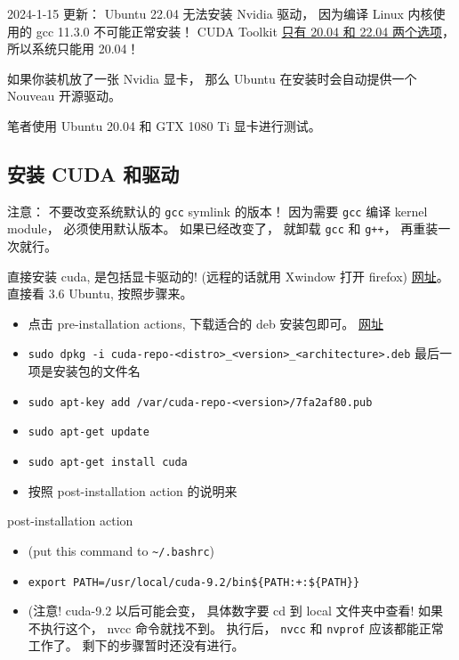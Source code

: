 
2024-1-15 更新： Ubuntu 22.04 无法安装 Nvidia 驱动， 因为编译 Linux 内核使用的 gcc 11.3.0 不可能正常安装！ CUDA Toolkit \href{https://developer.nvidia.com/cuda-downloads?target_os=Linux&target_arch=x86_64&Distribution=Ubuntu}{只有 20.04 和 22.04 两个选项}， 所以系统只能用 20.04！

如果你装机放了一张 Nvidia 显卡， 那么 Ubuntu 在安装时会自动提供一个 Nouveau 开源驱动。

笔者使用 Ubuntu 20.04 和 GTX 1080 Ti 显卡进行测试。

\subsection{安装 CUDA 和驱动}
注意： 不要改变系统默认的 \verb|gcc| symlink 的版本！ 因为需要 \verb|gcc| 编译 kernel module， 必须使用默认版本。 如果已经改变了， 就卸载 \verb|gcc| 和 \verb|g++|， 再重装一次就行。

直接安装 cuda, 是包括显卡驱动的! (远程的话就用 Xwindow 打开 firefox)
\href{https://docs.nvidia.com/cuda/cuda-installation-guide-linux/index.html#ubuntu-installation}{网址}。 直接看 3.6 Ubuntu, 按照步骤来。
\begin{itemize}
\item 点击 pre-installation actions, 下载适合的 deb 安装包即可。 \href{https://developer.nvidia.com/cuda-downloads}{网址}
\item \verb`sudo dpkg -i cuda-repo-<distro>_<version>_<architecture>.deb`   最后一项是安装包的文件名
\item \verb`sudo apt-key add /var/cuda-repo-<version>/7fa2af80.pub`
\item \verb`sudo apt-get update`
\item \verb`sudo apt-get install cuda`
\item 按照 post-installation action 的说明来
\end{itemize}

post-installation action
\begin{itemize}
\item (put this command to \verb|~/.bashrc|)
\item \verb`export PATH=/usr/local/cuda-9.2/bin${PATH:+:${PATH}}`
\item (注意! cuda-9.2 以后可能会变， 具体数字要 cd 到 local 文件夹中查看!
如果不执行这个， nvcc 命令就找不到。 执行后， \verb`nvcc` 和 \verb`nvprof` 应该都能正常工作了。
剩下的步骤暂时还没有进行。
\end{itemize}

